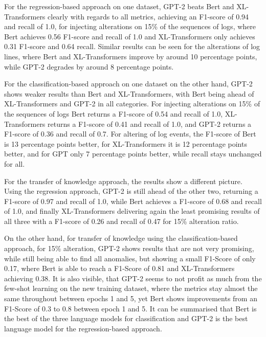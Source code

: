 For the regression-based approach on one dataset, GPT-2 beats Bert and XL-Transformers clearly with regards to all metrics, achieving an F1-score of 0.94 and recall of 1.0, for injecting alterations on 15\% of the sequences of logs, where Bert achieves 0.56 F1-score and recall of 1.0 and XL-Transformers only achieves 0.31 F1-score and 0.64 recall. Similar results can be seen for the alterations of log lines, where Bert and XL-Transformers improve by around 10 percentage points, while GPT-2 degrades by around 8 percentage points.

For the classification-based approach on one dataset on the other hand, GPT-2 shows weaker results than Bert and XL-Transformers, with Bert being ahead of XL-Transformers and GPT-2 in all categories. For injecting alterations on 15\% of the sequences of logs Bert returns a F1-score of 0.54 and recall of 1.0, XL-Transformers returns a F1-score of 0.41 and recall of 1.0, and GPT-2 returns a F1-score of 0.36 and recall of 0.7. For altering of log events, the F1-score of Bert is 13 percentage points better, for XL-Transformers it is 12 percentage points better, and for GPT only 7 percentage points better, while recall stays unchanged for all.

For the transfer of knowledge approach, the results show a different picture. Using the regression approach, GPT-2 is still ahead of the other two, returning a F1-score of 0.97 and recall of 1.0, while Bert achieves a F1-score of 0.68 and recall of 1.0, and finally XL-Transformers delivering again the least promising results of all three with a F1-score of 0.26 and recall of 0.47 for 15\% alteration ratio. 

On the other hand, for transfer of knowledge using the classification-based approach, for 15\% alteration, GPT-2 shows results that are not very promising, while still being able to find all anomalies, but showing a small F1-Score of only 0.17, where Bert is able to reach a F1-Score of 0.81 and XL-Transformers achieving 0.38. It is also visible, that GPT-2 seems to not profit as much from the few-shot learning on the new training dataset, where the metrics stay almost the same throughout between epochs 1 and 5, yet Bert shows improvements from an F1-Score of 0.3 to 0.8 between epoch 1 and 5. It can be summarised that Bert is the best of the three language models for classification and GPT-2 is the best language model for the regression-based approach.


